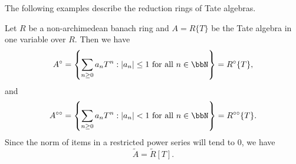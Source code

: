 


    The following examples describe the reduction rings of Tate algebras.

    \begin{example}\label{eg:reduction_ring_of_standard_tate_algebra_over_a_banach_ring}
        Let \(R\) be a non-archimedean banach ring and \(A = R\{T\}\) be the Tate algebra in one variable over \(R\).
        Then we have
        \[ A^\circ = \left\{ \sum_{n\geq 0} a_n T^n : |a_n| \leq 1 \text{ for all } n \in \bbN \right\}  = R^\circ \{ T \}, \]
        and
        \[ A^{\circ \circ} = \left\{ \sum_{n\geq 0} a_n T^n : |a_n| < 1 \text{ for all } n \in \bbN \right\}  = R^{\circ \circ} \{ T \}. \]
        Since the norm of items in a restricted power series will tend to \(0\), we have
        \[ \widetilde{A} = \widetilde{R} [T]. \] 
    \end{example}

